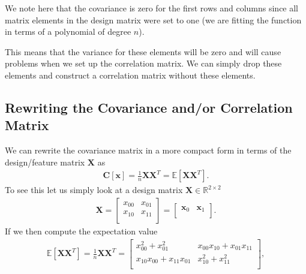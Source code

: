 \documentclass[letterpaper,10pt,english]{sphinxmanual}
\begin{document}
We note here that the covariance is zero for the first rows and
columns since all matrix elements in the design matrix were set to one
(we are fitting the function in terms of a polynomial of degree \(n\)).

This means that the variance for these elements will be zero and will
cause problems when we set up the correlation matrix.  We can simply
drop these elements and construct a correlation
matrix without these elements.


\subsection{Rewriting the Covariance and/or Correlation Matrix}
\label{\detokenize{chapter8:rewriting-the-covariance-and-or-correlation-matrix}}
We can rewrite the covariance matrix in a more compact form in terms of the design/feature matrix \(\boldsymbol{X}\) as
\begin{equation*}
\begin{split}
\boldsymbol{C}[\boldsymbol{x}] = \frac{1}{n}\boldsymbol{X}\boldsymbol{X}^T= \mathbb{E}[\boldsymbol{X}\boldsymbol{X}^T].
\end{split}
\end{equation*}
To see this let us simply look at a design matrix \(\boldsymbol{X}\in {\mathbb{R}}^{2\times 2}\)
\begin{equation*}
\begin{split}
\boldsymbol{X}=\begin{bmatrix}
x_{00} & x_{01}\\
x_{10} & x_{11}\\
\end{bmatrix}=\begin{bmatrix}
\boldsymbol{x}_{0} & \boldsymbol{x}_{1}\\
\end{bmatrix}.
\end{split}
\end{equation*}
If we then compute the expectation value
\begin{equation*}
\begin{split}
\mathbb{E}[\boldsymbol{X}\boldsymbol{X}^T] = \frac{1}{n}\boldsymbol{X}\boldsymbol{X}^T=\begin{bmatrix}
x_{00}^2+x_{01}^2 & x_{00}x_{10}+x_{01}x_{11}\\
x_{10}x_{00}+x_{11}x_{01} & x_{10}^2+x_{11}^2\\
\end{bmatrix},
\end{split}
\end{equation*}
\end{document}
